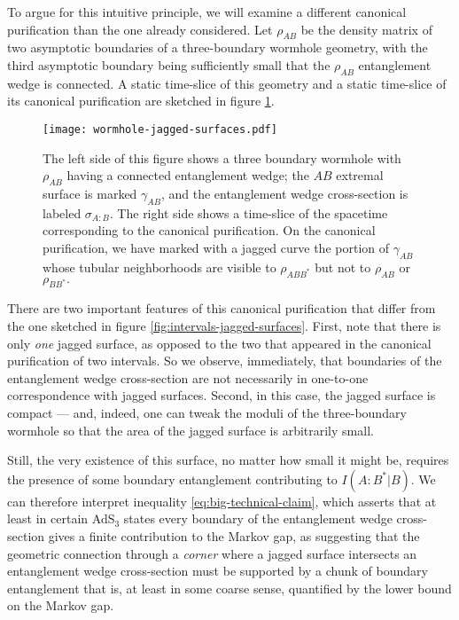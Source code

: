 \documentclass[a4paper,11pt]{article}
\begin{document}
To argue for this intuitive principle, we will examine a different canonical purification than the one already considered. Let $\rho_{AB}$ be the density matrix of two asymptotic boundaries of a three-boundary wormhole geometry, with the third asymptotic boundary being sufficiently small that the $\rho_{AB}$ entanglement wedge is connected. A static time-slice of this geometry and a static time-slice of its canonical purification are sketched in figure \ref{fig:wormhole-jagged-surfaces}.

\begin{figure}
    \centering
    \texttt{[image: wormhole-jagged-surfaces.pdf]}
    \caption{The left side of this figure shows a three boundary wormhole with $\rho_{AB}$ having a connected entanglement wedge; the $AB$ extremal surface is marked $\gamma_{AB}$, and the entanglement wedge cross-section is labeled $\sigma_{A:B}$. The right side shows a time-slice of the spacetime corresponding to the canonical purification. On the canonical purification, we have marked with a jagged curve the portion of $\gamma_{AB}$ whose tubular neighborhoods are visible to $\rho_{ABB^*}$ but not to $\rho_{AB}$ or $\rho_{BB^*}.$}
    \label{fig:wormhole-jagged-surfaces}
\end{figure}

There are two important features of this canonical purification that differ from the one sketched in figure \ref{fig:intervals-jagged-surfaces}. First, note that there is only \emph{one} jagged surface, as opposed to the two that appeared in the canonical purification of two intervals. So we observe, immediately, that boundaries of the entanglement wedge cross-section are not necessarily in one-to-one correspondence with jagged surfaces. Second, in this case, the jagged surface is compact --- and, indeed, one can tweak the moduli of the three-boundary wormhole so that the area of the jagged surface is arbitrarily small.

Still, the very existence of this surface, no matter how small it might be, requires the presence of some boundary entanglement contributing to $I(A:B^* | B).$ We can therefore interpret inequality \eqref{eq:big-technical-claim}, which asserts that at least in certain AdS$_3$ states every boundary of the entanglement wedge cross-section gives a finite contribution to the Markov gap, as suggesting that the geometric connection through a \emph{corner} where a jagged surface intersects an entanglement wedge cross-section must be supported by a chunk of boundary entanglement that is, at least in some coarse sense, quantified by the lower bound on the Markov gap.
\end{document}
